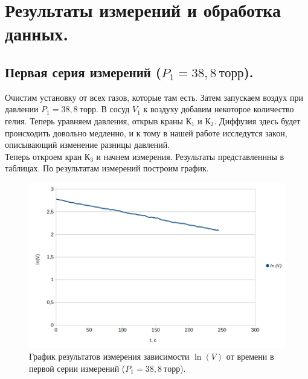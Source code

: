 \documentclass[a4paper,11pt]{article}
\begin{document}
\section{Результаты измерений и обработка данных.}
\subsection{Первая серия измерений ($P_{1} = 38,8\ торр$).}
Очистим установку от всех газов, которые там есть. Затем запускаем воздух при давлении $P_{1} = 38,8\ торр$. В сосуд $V_{1}$ к воздуху добавим некоторое количество гелия. Теперь уравняем давления, открыв краны К$_{1}$ и К$_{2}$. Диффузия здесь будет происходить довольно медленно, и к тому в нашей работе исследутся закон, описывающий изменение разницы давлений.\\
Теперь откроем кран К$_{3}$ и начнем измерения. Результаты представленнны в таблицах.
По результатам измерений построим график.
\begin{figure}[h!]\label{fig:img3}
  \centering
  \includegraphics[scale = 0.4125]{graph1.png}
  \caption{График результатов измерения зависимости $\ln(V)$ от времени в первой серии измерений ($P_{1} = 38,8\ торр$).}
\end{figure}
\end{document}
